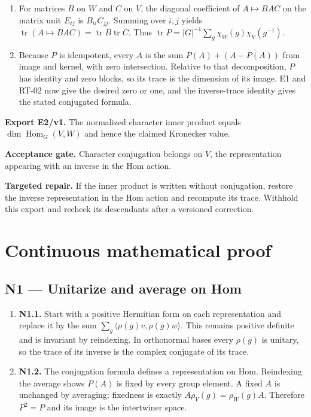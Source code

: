 \documentclass[preprint,12pt,aps,pra,showkeys,amsmath,amssymb,superscriptaddress,floatfix]{revtex4-2}
\theoremstyle{definition}
\theoremstyle{remark}
\newcommand{\field}[2]{\par\smallskip\noindent\textbf{#1.} #2\par}
\begin{document}
\begin{enumerate}[label=N2.\arabic*,leftmargin=3.4em]

\item For matrices \(B\) on \(W\) and \(C\) on \(V\), the diagonal coefficient
of \(A\mapsto BAC\) on the matrix unit \(E_{ij}\) is \(B_{ii}C_{jj}\).
Summing over \(i,j\) yields
\(\operatorname{tr}(A\mapsto BAC)=\operatorname{tr}B\operatorname{tr}C\).
Thus \(\operatorname{tr}P=|G|^{-1}\sum_g\chi_W(g)\chi_V(g^{-1})\).

\item Because \(P\) is idempotent, every \(A\) is the sum \(P(A)+(A-P(A))\)
from image and kernel, with zero intersection. Relative to that
decomposition, \(P\) has identity and zero blocks, so its trace is the
dimension of its image. E1 and RT-02 now give the desired zero or one,
and the inverse-trace identity gives the stated conjugated formula.

\end{enumerate}

\field{Export E2/v1}{The normalized character inner product equals
\(\dim\operatorname{Hom}_G(V,W)\) and hence the claimed Kronecker value.}

\field{Acceptance gate}{Character conjugation belongs on \(V\), the representation appearing
with an inverse in the Hom action.}

\field{Targeted repair}{If the inner product is written without conjugation, restore the inverse
representation in the Hom action and recompute its trace. Withhold this
export and recheck its descendants after a versioned correction.}

\endgroup\clearpage\section{Continuous mathematical proof}\label{sec:proof}

\subsection{N1 --- Unitarize and average on
Hom}\label{n1-unitarize-and-average-on-hom}

\begin{enumerate}
\def\labelenumi{\arabic{enumi}.}
\item
  \textbf{N1.1.} Start with a positive Hermitian form on each
  representation and replace it by the sum
  \(\sum_g\langle\rho(g)v,\rho(g)w\rangle\). This remains positive
  definite and is invariant by reindexing. In orthonormal bases every
  \(\rho(g)\) is unitary, so the trace of its inverse is the complex
  conjugate of its trace.
\item
  \textbf{N1.2.} The conjugation formula defines a representation on
  Hom. Reindexing the average shows \(P(A)\) is fixed by every group
  element. A fixed \(A\) is unchanged by averaging; fixedness is exactly
  \(A\rho_V(g)=\rho_W(g)A\). Therefore \(P^2=P\) and its image is the
  intertwiner space.
\end{enumerate}
\end{document}
